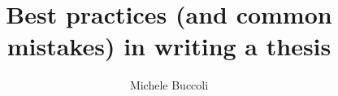 \documentclass[ebook,11pt,oneside,openany]{memoir}
\begin{document}
\title{Best practices (and common mistakes) in writing a thesis}
\author{Michele Buccoli}
\date{}
\maketitle

\section*{}





\end{document}
